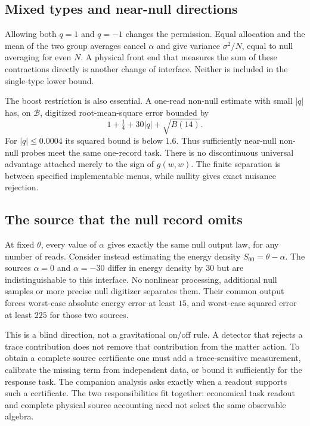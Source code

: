 \documentclass[12pt,a4paper]{article}
\theoremstyle{definition}
\begin{document}
\subsection{Mixed types and near-null directions}

Allowing both $q=1$ and $q=-1$ changes the permission. Equal allocation
and the mean of the two group averages cancel $\alpha$ and give variance
$\sigma^2/N$, equal to null averaging for even $N$. A physical front end
that measures the sum of these contractions directly is another change
of interface. Neither is included in the single-type lower bound.

The boost restriction is also essential. A one-read non-null estimate
with small $|q|$ has, on $\mathcal B$, digitized root-mean-square error
bounded by
\begin{equation}
 1+\tfrac14+30|q|+\sqrt{B(14)}.
\end{equation}
For $|q|\leq0.0004$ its squared bound is below $1.6$. Thus sufficiently
near-null non-null probes meet the same one-record task. There is no
discontinuous universal advantage attached merely to the sign of
$g(w,w)$. The finite separation is between specified implementable
menus, while nullity gives exact nuisance rejection.

\subsection{The source that the null record omits}

At fixed $\theta$, every value of $\alpha$ gives exactly the same null
output law, for any number of reads. Consider instead estimating the
energy density $S_{00}=\theta-\alpha$. The sources $\alpha=0$ and
$\alpha=-30$ differ in energy density by $30$ but are indistinguishable
to this interface. No nonlinear processing, additional null samples or
more precise null digitizer separates them. Their common output forces
worst-case absolute energy error at least $15$, and worst-case squared
error at least $225$ for those two sources.

This is a blind direction, not a gravitational on/off rule. A detector
that rejects a trace contribution does not remove that contribution from
the matter action. To obtain a complete source certificate one must add
a trace-sensitive measurement, calibrate the missing term from independent
data, or bound it sufficiently for the response task. The companion
analysis \cite{Liu2026NoView} asks exactly when a readout supports such a
certificate. The two responsibilities fit together: economical task
readout and complete physical source accounting need not select the same
observable algebra.
\end{document}
